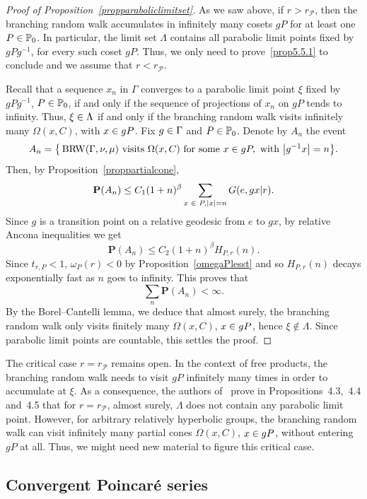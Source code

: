\documentclass[10pt]{amsart}
\theoremstyle{definition}\newtheorem{defi}[theo]{Definition}\newtheorem{rema}[theo]{Remark}\newtheorem{exam}[theo]{Example}\newtheorem{exem}[theo]{Example}\newtheorem{nota}[theo]{Notation}
\newcommand{\bbP}{\mathbb{P}}
\newcommand{\bfP}{\mathbf{P}}
\newcommand{\clP}{\mathcal{P}}
\DeclareMathOperator{\BRW}{BRW}
\let\originalleft\left
\let\originalright\right
\renewcommand{\left}{\mathopen{}\mathclose\bgroup\originalleft}
\renewcommand{\right}{\aftergroup\egroup\originalright}
\let\oldin\in
\renewcommand{\in}{\mathchoice{\oldin}{\oldin}{\,\oldin\,}{\,\oldin\,}}
\begin{document}
\begin{proof}[{Proof of Proposition~\ref{propparaboliclimitset}}]
As we saw above, if $r>r_\clP$, then the branching random walk accumulates in infinitely many cosets $gP$ for at least one $P\in \bbP_0$. In particular, the limit set $\Lambda$ contains all parabolic limit points fixed by $gPg^{-1}$, for every such coset $gP$. Thus, we only need to prove~\eqref{prop5.5.1} to conclude and we assume that $r<r_\clP$.

Recall that a sequence $x_n$ in $\Gamma$ converges to a parabolic limit point $\xi$ fixed by $gPg^{-1}$, $P\in \bbP_0$, if and only if the sequence of projections of $x_n$ on $gP$ tends to infinity. Thus, $\xi\in \Lambda$ if and only if the branching random walk visits infinitely many $\Omega(x,C)$, with $x\in gP$. Fix $g\in \Gamma$ and $P\in \bbP_0$. Denote by $A_n$ the event
\[
A_n=\big\{\BRW(\Gamma,\nu,\mu)\text{ visits } \Omega(x,C) \text{ for some } x\in gP,\text{ with } \left|g^{-1}x\right|=n\big\}.
\]
Then, by Proposition~\ref{proppartialcone},
\[
\bfP(A_n)\leq C_1(1+n)^\beta \sum_{x\in P,|x|=n}G(e,gx|r).
\]
Since $g$ is a transition point on a relative geodesic from $e$ to $gx$, by relative Ancona inequalities we get
\[
\bfP(A_n)\leq C_2(1+n)^\beta H_{P,r}(n).
\]
Since $t_{r,P}<1$, $\omega_P(r)<0$ by Proposition~\ref{omegaPlesst} and so $H_{P,r}(n)$ decays exponentially fast as $n$ goes to infinity. This proves that
\[
\sum_{n}\bfP(A_n)<\infty.
\]
By the Borel--Cantelli lemma, we deduce that almost surely, the branching random walk only visits finitely many $\Omega(x,C)$, $x\in gP$, hence $\xi\notin \Lambda$. Since parabolic limit points are countable, this settles the proof.
\end{proof}



The critical case $r=r_\clP$ remains open. In the context of free products, the branching random walk needs to visit $gP$ infinitely many times in order to accumulate at $\xi$. As a consequence, the authors of~\cite{CandelleroGilchMuller} prove in Propositions~4.3,~4.4 and~4.5 that for $r=r_\clP$, almost surely, $\Lambda$ does not contain any parabolic limit point. However, for arbitrary relatively hyperbolic groups, the branching random walk can visit infinitely many partial cones $\Omega(x,C)$, $x\in gP$, without entering $gP$ at all. Thus, we might need new material to figure this critical case.



\subsection{Convergent Poincaré series}
\label{SectionconvergentPoincare}
\end{document}
